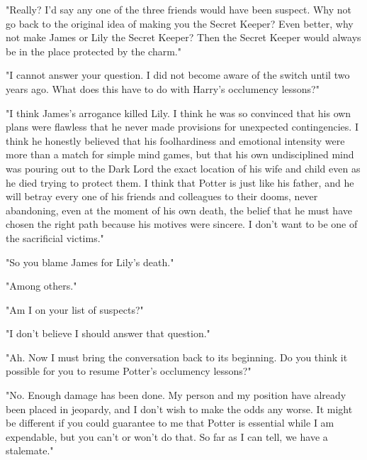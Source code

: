 "Really? I'd say any one of the three friends would have been suspect. Why not go back to the original idea of making you the Secret Keeper? Even better, why not make James or Lily the Secret Keeper? Then the Secret Keeper would always be in the place protected by the charm."

"I cannot answer your question. I did not become aware of the switch until two years ago. What does this have to do with Harry's occlumency lessons?"

"I think James's arrogance killed Lily. I think he was so convinced that his own plans were flawless that he never made provisions for unexpected contingencies. I think he honestly believed that his foolhardiness and emotional intensity were more than a match for simple mind games, but that his own undisciplined mind was pouring out to the Dark Lord the exact location of his wife and child even as he died trying to protect them. I think that Potter is just like his father, and he will betray every one of his friends and colleagues to their dooms, never abandoning, even at the moment of his own death, the belief that he must have chosen the right path because his motives were sincere. I don't want to be one of the sacrificial victims."

"So you blame James for Lily's death."

"Among others."

"Am I on your list of suspects?"

"I don't believe I should answer that question."

"Ah. Now I must bring the conversation back to its beginning. Do you think it possible for you to resume Potter's occlumency lessons?"

"No. Enough damage has been done. My person and my position have already been placed in jeopardy, and I don't wish to make the odds any worse. It might be different if you could guarantee to me that Potter is essential while I am expendable, but you can't or won't do that. So far as I can tell, we have a stalemate."


